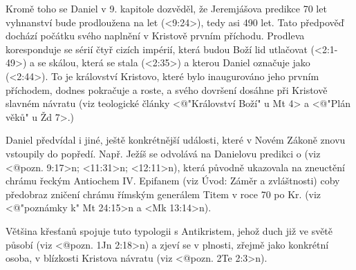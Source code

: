 Kromě toho se Daniel v 9. kapitole dozvěděl, že Jeremjášova predikce 70 let vyhnanství bude prodloužena 
na  let (<9:24>), tedy asi 490 let.
Tato předpověď dochází počátku svého naplnění v Kristově prvním příchodu. Prodleva koresponduje se sérií čtyř cizích impérií, která budou Boží lid utlačovat (<2:1-49>) a se skálou, která se stala  (<2:35>) a kterou Daniel označuje jako  (<2:44>). 
To je království Kristovo, které bylo inaugurováno jeho prvním příchodem, dodnes pokračuje a roste, a svého dovršení dosáhne při Kristově slavném návratu (viz teologické články <@"Království Boží" u Mt 4> a <@"Plán věků" u Žd 7>.)

Daniel předvídal i jiné, ještě konkrétnější události, které v Novém Zákoně znovu vstoupily do popředí.
Např. Ježíš  se odvolává na Danielovu predikci o  (viz <@pozn. 9:17>n; <11:31>n; <12:11>n),
která původně ukazovala na zneuctění chrámu řeckým Antiochem IV. Epifanem (viz Úvod: Záměr a zvláštnosti) coby předobraz zničení chrámu  římským generálem Titem v roce 70 po Kr. (viz <@"poznámky k" Mt 24:15>n a <Mk 13:14>n).

Většina křesťanů spojuje tuto typologii s Antikristem, jehož duch již ve světě působí (viz <@pozn. 1Jn 2:18>n) a zjeví se v plnosti, zřejmě jako konkrétní osoba, v blízkosti Kristova návratu (viz <@pozn. 2Te 2:3>n).


\endinput




Překlad z DeepL.com:
Autor:  Daniel

Záměr: Ujistit vyhnance a první navrátilce do Země, že Bůh řídí dějiny a že
jeho prorok Daniel mluvil pravdu o prodloužené době útrap před závěrečnou fází Božího království.

Datum: Krátce po roce 539 př.Kr.

Klíčové pravdy:

- Daniel a jeho přátelé byli věrní Bohu během
v době svého vyhnanství.

- Danielovi se dalo věřit, že říká pravdu, protože
nikdy nedělal kompromisy se svými vězniteli.

- Bůh má absolutní kontrolu nad celými dějinami.

- Vyhnanství Izraele se protáhlo na vládu čtyř království.
nad Božím lidem pro jejich  hřích, který ani ve vyhnanství neopustili.

 V budoucnu měly přijít pro Izrael zkoušky, ale Pomazaný (Mesiáš), Kristus, přijde a přinese spasení.

